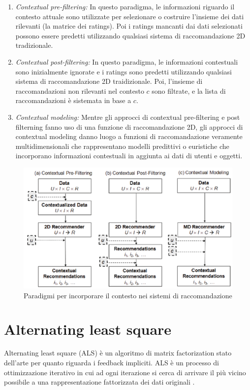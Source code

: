 \documentclass[12pt,italian]{report}
\begin{document}
\begin{enumerate}
 \item \textit{Contextual pre-filtering:} In questo paradigma, le informazioni riguardo il contesto attuale sono utilizzate per selezionare o costruire l'insieme dei dati rilevanti (la matrice dei ratings). Poi i ratings mancanti dai dati selezionati possono essere predetti utilizzando qualsiasi sistema di raccomandazione 2D tradizionale.
 \item \textit{Contextual post-filtering:} In questo paradigma, le informazioni contestuali sono inizialmente ignorate e i ratings sono predetti utilizzando qualsiasi sistema di raccomandazione 2D traidizionale. Poi, l'insieme di raccomandazioni non rilevanti nel contesto $c$ sono filtrate, e la lista di raccomandazioni è sistemata in base a $c$.
 \item  \textit{Contextual modeling:} Mentre gli approcci di contextual pre-filtering e post filterning fanno uso di una funzione di raccomandazione 2D, gli approcci di contextual modeling danno luogo a funzioni di raccomandazione veramente multidimensionali che rappresentano modelli predittivi o euristiche che incorporano informazioni contestuali in aggiunta ai dati di utenti e oggetti.
\end{enumerate}

\begin{figure}
  \includegraphics[width=\linewidth]{immagini/paradigm_for_context_inclusion.png}
  \caption{Paradigmi per incorporare il contesto nei sistemi di raccomandazione}
  \label{fig:context-paradigm}
\end{figure}

\section{Alternating least square}
Alternating least square (ALS) \cite{als} è un algoritmo di matrix factorization stato dell'arte per quanto riguarda i feedback impliciti. ALS è un processo di ottimizzazione iterativo in cui ad ogni iterazione si cerca di arrivare il più vicino possibile a una rappresentazione fattorizzata dei dati originali \cite{als-medium}. 
\end{document}
